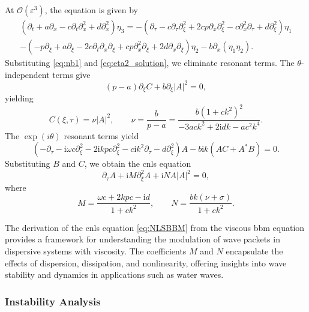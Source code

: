 \documentclass[alpha-refs, 12pt]{wiley-article}
\renewcommand{\O}{\mathcal{O}}
\newcommand{\ui}{\mathrm{i}}
\newcommand{\eps}{\varepsilon}
\begin{document}
At $\O(\eps^3)$, the equation is given by
\begin{multline}\label{eq:third_order_b}
  \left( \partial_t + a \partial_x - c \partial_t \partial_x^2 + d \partial_x^2 \right) \eta_3 = - \left( \partial_\tau - c \partial_\tau \partial_\xi^2 + 2 c p \partial_x \partial_\xi^2 - c \partial_x^2 \partial_\tau + d \partial_\xi^2 \right) \eta_1 \\
- \left( -p \partial_\xi + a \partial_\xi - 2 c \partial_t \partial_x \partial_\xi + c p \partial_x^2 \partial_\xi + 2 d \partial_x \partial_\xi \right) \eta_2 - b \partial_x (\eta_1 \eta_2).
\end{multline}
Substituting \eqref{eq:nb1} and \eqref{eq:eta2_solution}, we eliminate resonant terms. The $\theta$-independent terms give
\begin{equation}\label{eq:C_equation}
  (p - a) \partial_\xi C + b \partial_\xi |A|^2 = 0,
\end{equation}
yielding
\[
  C(\xi, \tau) = \nu |A|^2, \qquad \nu = \frac{b}{p - a} = \frac{b (1 + c k^2)^2}{-3 a c k^2 + 2 \ui d k - a c^2 k^4}.
\]
The $\exp(i \theta)$ resonant terms yield
\begin{equation}\label{eq:resonance_bbm}
  \left( -\partial_\tau - \ui \omega c \partial_\xi^2 - 2 \ui k p c \partial_\xi^2 - c \ui k^2 \partial_\tau - d \partial_\xi^2 \right) A - b \ui k (A C + A^* B) = 0.
\end{equation}
Substituting $B$ and $C$, we obtain the \acrshort{cnls} equation
\begin{equation}\label{eq:NLSBBM}
  \partial_\tau A + \ui M \partial_\xi^2 A + \ui N A |A|^2 = 0,
\end{equation}
where
\[
  M = \frac{\omega c + 2 k p c - \ui d}{1 + c k^2}, \qquad N = \frac{b k (\nu + \sigma)}{1 + c k^2}.
\]

The derivation of the \acrshort{cnls} equation \eqref{eq:NLSBBM} from the viscous \acrshort{bbm} equation provides a framework for understanding the modulation of wave packets in dispersive systems with viscosity. The coefficients $M$ and $N$ encapsulate the effects of dispersion, dissipation, and nonlinearity, offering insights into wave stability and dynamics in applications such as water waves.

\subsubsection{Instability Analysis}
\end{document}
